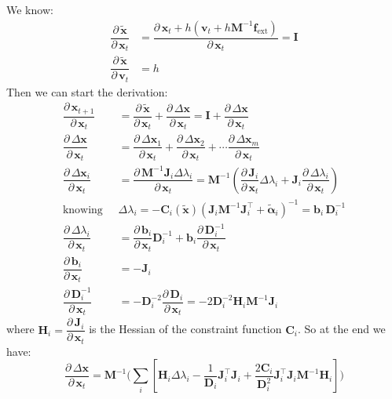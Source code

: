 \documentclass{article}
\newcommand{\pd}[2]{\dfrac{\partial\, #1}{\partial\, #2}}
\begin{document}
We know:
\begin{equation}
\begin{aligned}
\pd{\tilde{\mathbf{x}}}{\mathbf{x}_t} &= 
\pd{\mathbf{x}_t + h(\mathbf{v}_t + h \mathbf{M}^{-1}\mathbf{f}_{\text{ext}})}{\mathbf{x}_t} = \mathbf{I}\\
\pd{\tilde{\mathbf{x}}}{\mathbf{v}_t} &= h
\end{aligned}
\end{equation}
Then we can start the derivation:
\begin{equation*}
\begin{aligned}
\pd{\mathbf{x}_{t+1}}{\mathbf{x}_t} &= \pd{\tilde{\mathbf{x}}}{\mathbf{x}_t} + \pd{\Delta \mathbf{x}}{\mathbf{x}_t} = \mathbf{I} + \pd{\Delta \mathbf{x}}{\mathbf{x}_t} \\[1ex]
\pd{\Delta \mathbf{x}}{\mathbf{x}_t} &= \pd{\Delta \mathbf{x}_1}{\mathbf{x}_t} +\pd{\Delta \mathbf{x}_2}{\mathbf{x}_t} + \cdots \pd{\Delta \mathbf{x}_m}{\mathbf{x}_t} \\[1ex]
\pd{\Delta \mathbf{x}_i}{\mathbf{x}_t} &= \pd{\mathbf{M}^{-1}\mathbf{J}_i \Delta \lambda_i}{\mathbf{x}_t} = \mathbf{M}^{-1}\left( \pd{\mathbf{J}_i}{\mathbf{x}_t} \Delta \lambda_i + \mathbf{J}_i \pd{\Delta \lambda_i}{\mathbf{x}_t} \right) \\[2ex]
\text{knowing }\; &\boxed{\Delta \lambda_i = - \mathbf{C}_i(\tilde{\mathbf{x}})(\mathbf{J}_i\mathbf{M}^{-1}\mathbf{J}_i^\top + \tilde{\boldsymbol{\alpha}}_i)^{-1} = \mathbf{b}_i\, \mathbf{D}_i^{-1}} \\[2ex]
\pd{\Delta \lambda_i}{\mathbf{x}_t} &= \pd{\mathbf{b}_i}{{\mathbf{x}_t}}\mathbf{D}_i^{-1} + \mathbf{b}_i\pd{\mathbf{D}_i^{-1}}{{\mathbf{x}_t}} \\[1ex]
\pd{\mathbf{b}_i}{{\mathbf{x}_t}} &= - \mathbf{J}_i \\[1ex]
\pd{\mathbf{D}_i^{-1}}{{\mathbf{x}_t}} &= -\mathbf{D}_i^{-2}\pd{\mathbf{D}_i}{\mathbf{x}_t} =  -2 \mathbf{D}_i^{-2} \mathbf{H}_i\mathbf{M}^{-1}\mathbf{J}_i
\end{aligned}
\end{equation*}
where $\mathbf{H}_i= \pd{\mathbf{J}_i}{\mathbf{x}_t}$ is the Hessian of the constraint function $\mathbf{C}_i$. So at the end we have:
\begin{equation}
\pd{\Delta \mathbf{x}}{\mathbf{x}_t} = 
\mathbf{M}^{-1} 
\bigg( \sum_i
\left[
\mathbf{H}_i\Delta\lambda_i - 
\frac{1}{\mathbf{D}_i}\mathbf{J}_i^\top\mathbf{J}_i + \frac{2\mathbf{C}_i}{\mathbf{D}_i^{2}}\mathbf{J}_i^\top\mathbf{J}_i\mathbf{M}^{-1}\mathbf{H}_i
\right] 
\bigg)
\end{equation}
\end{document}

